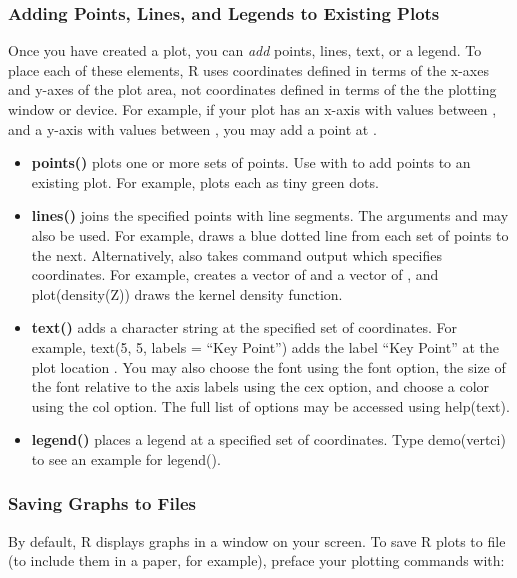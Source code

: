 \documentclass[letterpaper,10pt,english]{sphinxmanual}
\begin{document}
\subsubsection{Adding Points, Lines, and Legends to Existing Plots}
\label{docs/user_guide:adding-points-lines-and-legends-to-existing-plots}
Once you have created a plot, you can \emph{add} points, lines, text, or a
legend. To place each of these elements, R uses coordinates defined in
terms of the x-axes and y-axes of the plot area, not coordinates defined
in terms of the the plotting window or device. For example, if your plot
has an x-axis with values between , and a y-axis with values between , you may add a
point at .
\begin{itemize}
\item {} 
\textbf{points()} plots one or more sets of points. Use  with
 to add points to an existing plot. For example,
 plots each
 as tiny green dots.

\item {} 
\textbf{lines()} joins the specified points with line segments. The
arguments  and  may also be used. For example,
 draws a blue dotted line
from each set of points  to the next.
Alternatively,  also takes command output which specifies
 coordinates. For example,  creates a
vector of  and a vector of , and plot(density(Z))
draws the kernel density function.

\item {} 
\textbf{text()} adds a character string at the specified set of
 coordinates. For example, text(5, 5, labels = “Key
Point”) adds the label “Key Point” at the plot location
. You may also choose the font using the font option,
the size of the font relative to the axis labels using the cex
option, and choose a color using the col option. The full list of
options may be accessed using help(text).

\item {} 
\textbf{legend()} places a legend at a specified set of 
coordinates. Type demo(vertci) to see an example for legend().

\end{itemize}


\subsubsection{Saving Graphs to Files}
\label{docs/user_guide:saving-graphs-to-files}
By default, R displays graphs in a window on your screen. To save R
plots to file (to include them in a paper, for example), preface your
plotting commands with:
\end{document}
